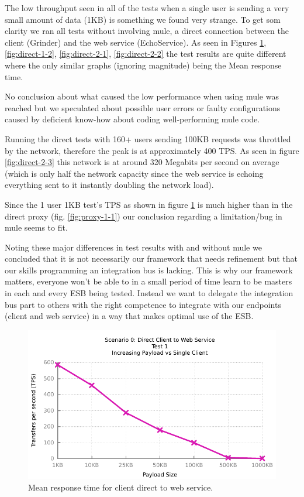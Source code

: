 The low throughput seen in all of the tests when a single user is sending a very small amount of data (1KB) is something we found very strange.
To get som clarity we ran all tests without involving mule, a direct connection between the client (Grinder) and the web service (EchoService). As seen in Figures \ref{fig:direct-1-1}, \ref{fig:direct-1-2}, \ref{fig:direct-2-1}, \ref{fig:direct-2-2} the test results are quite different where the only similar graphs (ignoring magnitude) being the Mean response time.

No conclusion about what caused the low performance when using mule was reached but we speculated about possible user errors or faulty configurations caused by deficient know-how about coding well-performing mule code.

Running the direct tests with 160+ users sending 100KB requests was throttled by the network, therefore the peak is at approximately 400 TPS. As seen in figure \ref{fig:direct-2-3} this network is at around 320 Megabits per second on average (which is only half the network capacity since the web service is echoing everything sent to it instantly doubling the network load).

Since the 1 user 1KB test's TPS as shown in figure \ref{fig:direct-1-1} is much higher than in the direct proxy (fig. \ref{fig:proxy-1-1}) our conclusion regarding a limitation/bug in mule seems to fit.

Noting these major differences in test results with and without mule we concluded that it is not necessarily our framework that needs refinement but that our skills programming an integration bus is lacking. This is why our framework matters, everyone won't be able to in a small period of time learn to be masters in each and every ESB being tested. Instead we want to delegate the integration bus part to others with the right competence to integrate with our endpoints (client and web service) in a way that makes optimal use of the ESB.

\begin{figure}[H]
	\caption{Mean response time for client direct to web service.}
	\centerline{\includegraphics{img/direct_fu_ip_tps}}
	\label{fig:direct-1-1}
\end{figure}

